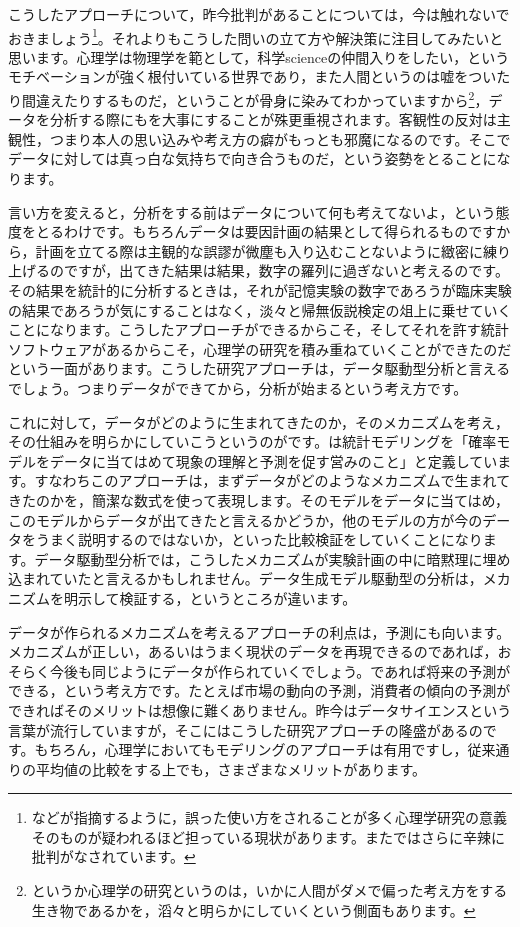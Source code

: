 \documentclass{ltjsbook}
\begin{document}
こうしたアプローチについて，昨今批判があることについては，今は触れないでおきましょう\footnote{\citet{amrhein2019scientists}などが指摘するように，誤った使い方をされることが多く心理学研究の意義そのものが疑われるほど担っている現状があります。また\citet{Toyoda202003}ではさらに辛辣に批判がなされています。}。それよりもこうした問いの立て方や解決策に注目してみたいと思います。心理学は物理学を範として，科学scienceの仲間入りをしたい，というモチベーションが強く根付いている世界であり，また人間というのは嘘をついたり間違えたりするものだ，ということが骨身に染みてわかっていますから\footnote{というか心理学の研究というのは，いかに人間がダメで偏った考え方をする生き物であるかを，滔々と明らかにしていくという側面もあります。}，データを分析する際にもを大事にすることが殊更重視されます。客観性の反対は主観性，つまり本人の思い込みや考え方の癖がもっとも邪魔になるのです。そこでデータに対しては真っ白な気持ちで向き合うものだ，という姿勢をとることになります。

言い方を変えると，分析をする前はデータについて何も考えてないよ，という態度をとるわけです。もちろんデータは要因計画の結果として得られるものですから，計画を立てる際は主観的な誤謬が微塵も入り込むことないように緻密に練り上げるのですが，出てきた結果は結果，数字の羅列に過ぎないと考えるのです。その結果を統計的に分析するときは，それが記憶実験の数字であろうが臨床実験の結果であろうが気にすることはなく，淡々と帰無仮説検定の俎上に乗せていくことになります。こうしたアプローチができるからこそ，そしてそれを許す統計ソフトウェアがあるからこそ，心理学の研究を積み重ねていくことができたのだという一面があります。こうした研究アプローチは，データ駆動型分析と言えるでしょう。つまりデータができてから，分析が始まるという考え方です。

これに対して，データがどのように生まれてきたのか，そのメカニズムを考え，その仕組みを明らかにしていこうというのがです。\citet{Matsuura201610}は統計モデリングを「確率モデルをデータに当てはめて現象の理解と予測を促す営みのこと」と定義しています。すなわちこのアプローチは，まずデータがどのようなメカニズムで生まれてきたのかを，簡潔な数式を使って表現します。そのモデルをデータに当てはめ，このモデルからデータが出てきたと言えるかどうか，他のモデルの方が今のデータをうまく説明するのではないか，といった比較検証をしていくことになります。データ駆動型分析では，こうしたメカニズムが実験計画の中に暗黙理に埋め込まれていたと言えるかもしれません。データ生成モデル駆動型の分析は，メカニズムを明示して検証する，というところが違います。

データが作られるメカニズムを考えるアプローチの利点は，予測にも向います。メカニズムが正しい，あるいはうまく現状のデータを再現できるのであれば，おそらく今後も同じようにデータが作られていくでしょう。であれば将来の予測ができる，という考え方です。たとえば市場の動向の予測，消費者の傾向の予測ができればそのメリットは想像に難くありません。昨今はデータサイエンスという言葉が流行していますが，そこにはこうした研究アプローチの隆盛があるのです。もちろん，心理学においてもモデリングのアプローチは有用ですし，従来通りの平均値の比較をする上でも，さまざまなメリットがあります。
\end{document}
